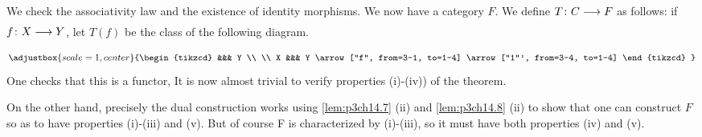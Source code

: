 \documentclass[../main]{subfiles}
\begin{document}
We check the associativity law and the existence of identity morphisms. We now have a category $F$. We define $T\colon C \lar{} F$ as follows: if $f\colon X \lar{} Y$, let $T(f)$ be the class of the following diagram.
\[
\adjustbox{scale=1, center}{%
\begin{tikzcd}
	&&& Y \\
	\\
	X &&& Y
	\arrow["f", from=3-1, to=1-4]
	\arrow["1"', from=3-4, to=1-4]
\end{tikzcd}
} \]
One checks that this is a functor, It is now almost trivial to verify properties (i)-(iv)) of the theorem.

On the other hand, precisely the dual construction works using \ref{lem:p3ch14.7} (ii) and \ref{lem:p3ch14.8} (ii) to show that one can construct $F$ so as to have properties (i)-(iii) and (v). But of course F is characterized by (i)-(iii), so it must have both properties (iv) and (v). 
\end{document}
